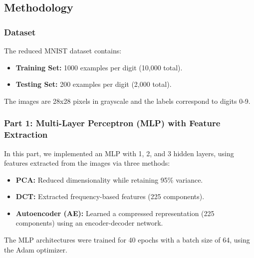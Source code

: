 \documentclass[a4paper,12pt]{article}
\begin{document}
\subsection{Methodology}

\subsubsection{Dataset}
The reduced MNIST dataset contains:
\begin{itemize}
    \item \textbf{Training Set:} 1000 examples per digit (10,000 total).
    \item \textbf{Testing Set:} 200 examples per digit (2,000 total).
\end{itemize}
The images are 28x28 pixels in grayscale and the labels correspond to digits 0-9.

\subsubsection{Part 1: Multi-Layer Perceptron (MLP) with Feature Extraction}
In this part, we implemented an MLP with 1, 2, and 3 hidden layers, using features extracted from the images via three methods:
\begin{itemize}
    \item \textbf{PCA:} Reduced dimensionality while retaining 95\% variance.
    \item \textbf{DCT:} Extracted frequency-based features (225 components).
    \item \textbf{Autoencoder (AE):} Learned a compressed representation (225 components) using an encoder-decoder network.
\end{itemize}
The MLP architectures were trained for 40 epochs with a batch size of 64, using the Adam optimizer.
\end{document}
